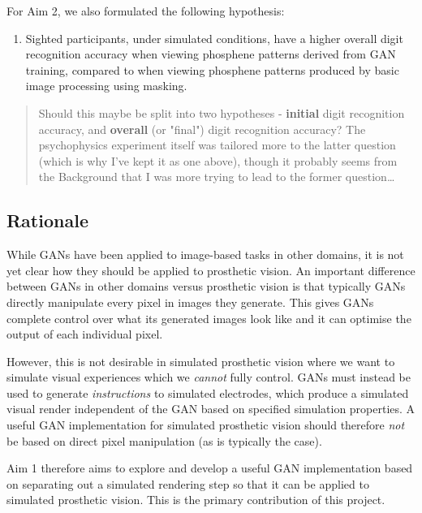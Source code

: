 \documentclass[11pt]{article}
\begin{document}
For Aim 2, we also formulated the following hypothesis:

\begin{enumerate}
\item Sighted participants, under simulated conditions, have a higher overall digit recognition accuracy when viewing phosphene patterns derived from GAN training, compared to when viewing phosphene patterns produced by basic image processing using masking.
\end{enumerate}

\begin{quote}


\color{red}

Should this maybe be split into two hypotheses - \textbf{initial} digit recognition accuracy, and \textbf{overall} (or "final") digit recognition accuracy?
The psychophysics experiment itself was tailored more to the latter question (which is why I've kept it as one above), though it probably seems from the Background that I was more trying to lead to the former question\ldots{}
\end{quote}

\subsection{Rationale}
\label{sec:org0bb5ba4}

While GANs have been applied to image-based tasks in other domains, it is not yet clear how they should be applied to prosthetic vision.
An important difference between GANs in other domains versus prosthetic vision is that typically GANs directly manipulate every pixel in images they generate.
This gives GANs complete control over what its generated images look like and it can optimise the output of each individual pixel.

However, this is not desirable in simulated prosthetic vision where we want to simulate visual experiences which we \emph{cannot} fully control.
GANs must instead be used to generate \emph{instructions} to simulated electrodes, which produce a simulated visual render independent of the GAN based on specified simulation properties.
A useful GAN implementation for simulated prosthetic vision should therefore \emph{not} be based on direct pixel manipulation (as is typically the case).

Aim 1 therefore aims to explore and develop a useful GAN implementation based on separating out a simulated rendering step so that it can be applied to simulated prosthetic vision.
This is the primary contribution of this project.
\end{document}
